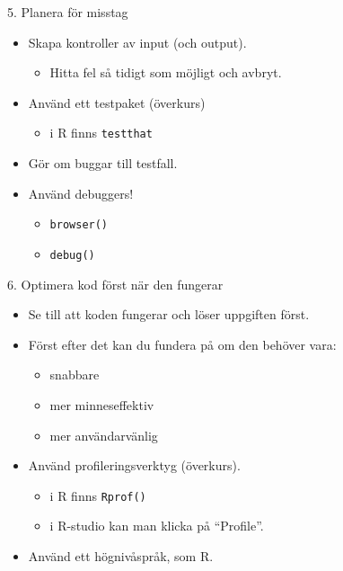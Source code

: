 \documentclass[
  11pt,
  ignorenonframetext,
]{beamer}
\providecommand{\tightlist}{%
  \setlength{\itemsep}{0pt}\setlength{\parskip}{0pt}}
\begin{document}
\begin{frame}{5. Planera för misstag}
\protect\hypertarget{planera-fuxf6r-misstag}{}
\begin{itemize}
\tightlist
\item
  Skapa kontroller av input (och output).

  \begin{itemize}
  \tightlist
  \item
    Hitta fel så tidigt som möjligt och avbryt.
  \end{itemize}
\item
  Använd ett testpaket (överkurs)

  \begin{itemize}
  \tightlist
  \item
    i R finns \texttt{testthat}
  \end{itemize}
\item
  Gör om buggar till testfall.
\item
  Använd debuggers!

  \begin{itemize}
  \tightlist
  \item
    \texttt{browser()}
  \item
    \texttt{debug()}
  \end{itemize}
\end{itemize}
\end{frame}

\begin{frame}{6. Optimera kod först när den fungerar}
\protect\hypertarget{optimera-kod-fuxf6rst-nuxe4r-den-fungerar}{}
\begin{itemize}
\tightlist
\item
  Se till att koden fungerar och löser uppgiften först.
\item
  Först efter det kan du fundera på om den behöver vara:

  \begin{itemize}
  \tightlist
  \item
    snabbare
  \item
    mer minneseffektiv
  \item
    mer användarvänlig
  \end{itemize}
\item
  Använd profileringsverktyg (överkurs).

  \begin{itemize}
  \tightlist
  \item
    i R finns \texttt{Rprof()}
  \item
    i R-studio kan man klicka på ``Profile''.
  \end{itemize}
\item
  Använd ett högnivåspråk, som R.
\end{itemize}
\end{frame}
\end{document}
